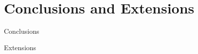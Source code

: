 \section{Conclusions and Extensions}
\begin{frame}{Conclusions}
\end{frame}
\begin{frame}{Extensions}
\end{frame}
